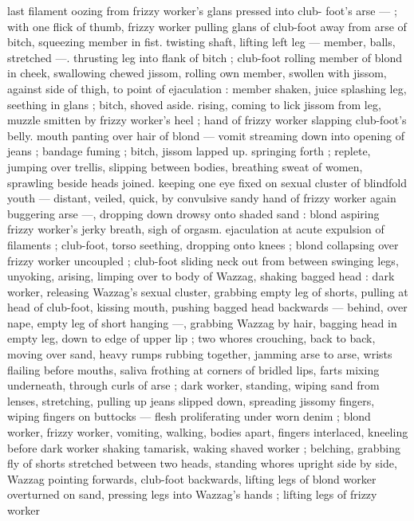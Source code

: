 last filament oozing from frizzy worker's glans pressed into club- 
foot's arse --- ; with one flick of thumb, frizzy worker pulling glans 
of club-foot away from arse of bitch, squeezing member in fist. 
twisting shaft, lifting left leg --- member, balls, stretched ---. 
thrusting leg into flank of bitch ; club-foot rolling member of blond 
in cheek, swallowing chewed jissom, rolling own member, swollen 
with jissom, against side of thigh, to point of ejaculation : member 
shaken, juice splashing leg, seething in glans ; bitch, shoved aside. 
rising, coming to lick jissom from leg, muzzle smitten by frizzy 
worker's heel ; hand of frizzy worker slapping club-foot's belly. 
mouth panting over hair of blond --- vomit streaming down into 
opening of jeans ; bandage fuming ; bitch, jissom lapped up. 
springing forth ; replete, jumping over trellis, slipping between 
bodies, breathing sweat of women, sprawling beside heads joined. 
keeping one eye fixed on sexual cluster of blindfold youth --- 
distant, veiled, quick, by convulsive sandy hand of frizzy worker 
again buggering arse ---, dropping down drowsy onto shaded sand : 
blond aspiring frizzy worker's jerky breath, sigh of orgasm. 
ejaculation at acute expulsion of filaments ; club-foot, torso 
seething, dropping onto knees ; blond collapsing over frizzy worker 
uncoupled ; club-foot sliding neck out from between swinging legs, 
unyoking, arising, limping over to body of Wazzag, shaking bagged 
head : dark worker, releasing Wazzag's sexual cluster, grabbing 
empty leg of shorts, pulling at head of club-foot, kissing mouth, 
pushing bagged head backwards --- behind, over nape, empty leg of 
short hanging ---, grabbing Wazzag by hair, bagging head in empty 
leg, down to edge of upper lip ; two whores crouching, back to back, 
moving over sand, heavy rumps rubbing together, jamming arse to 
arse, wrists flailing before mouths, saliva frothing at corners of 
bridled lips, farts mixing underneath, through curls of arse ; dark 
worker, standing, wiping sand from lenses, stretching, pulling up 
jeans slipped down, spreading jissomy fingers, wiping fingers on 
buttocks --- flesh proliferating under worn denim ; blond worker, 
frizzy worker, vomiting, walking, bodies apart, fingers interlaced, 
kneeling before dark worker shaking tamarisk, waking shaved worker 
; belching, grabbing fly of shorts stretched between two heads, 
standing whores upright side by side, Wazzag pointing forwards, 
club-foot backwards, lifting legs of blond worker overturned on 
sand, pressing legs into Wazzag's hands ; lifting legs of frizzy worker 
